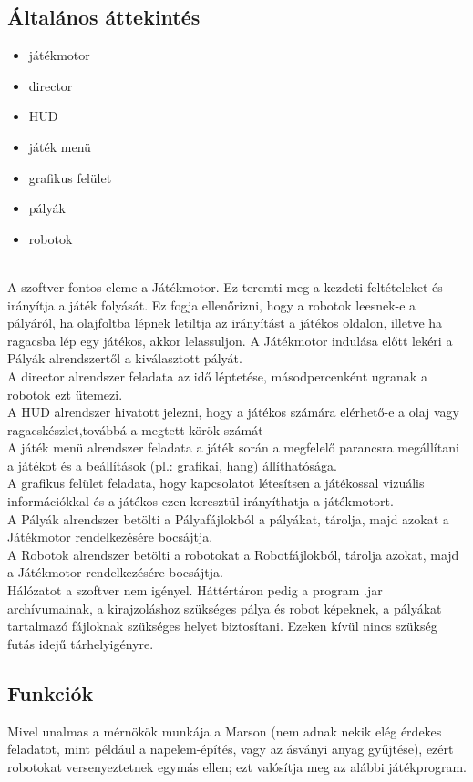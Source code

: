 \subsection{Általános áttekintés}
\begin{itemize}
\item játékmotor
\item director
\item HUD
\item játék menü
\item grafikus felület
\item pályák
\item robotok
\end{itemize}
\\A szoftver fontos eleme a Játékmotor. Ez teremti meg a kezdeti feltételeket és irányítja a játék folyását. Ez fogja ellenőrizni, hogy a robotok leesnek-e a pályáról, ha olajfoltba lépnek letiltja az irányítást a játékos oldalon, illetve ha ragacsba lép egy játékos, akkor lelassuljon. A Játékmotor indulása előtt lekéri a Pályák alrendszertől a kiválasztott pályát.
\\A director alrendszer feladata az idő léptetése, másodpercenként ugranak a robotok ezt ütemezi.
\\A HUD alrendszer hivatott jelezni, hogy a játékos számára elérhető-e a olaj vagy ragacskészlet,továbbá a megtett körök számát
\\A játék menü alrendszer feladata a játék során a megfelelő parancsra megállítani a játékot és a beállítások (pl.: grafikai, hang) állíthatósága.
\\A grafikus felület feladata, hogy kapcsolatot létesítsen a játékossal vizuális információkkal és a játékos ezen keresztül irányíthatja a játékmotort.
\\A Pályák alrendszer betölti a Pályafájlokból a pályákat, tárolja, majd azokat a Játékmotor rendelkezésére bocsájtja.
\\A Robotok alrendszer betölti a robotokat a Robotfájlokból, tárolja azokat, majd a Játékmotor rendelkezésére bocsájtja.
\\Hálózatot a szoftver nem igényel. Háttértáron pedig a program .jar archívumainak, a kirajzoláshoz szükséges pálya és robot képeknek, a pályákat tartalmazó fájloknak szükséges helyet biztosítani. Ezeken kívül nincs szükség futás idejű tárhelyigényre. 

\pagebreak
\subsection{Funkciók}
Mivel unalmas a mérnökök munkája a Marson (nem adnak nekik elég érdekes feladatot, mint például a napelem-építés, vagy az ásványi anyag gyűjtése), ezért robotokat versenyeztetnek egymás ellen; ezt valósítja meg az alábbi játékprogram.

